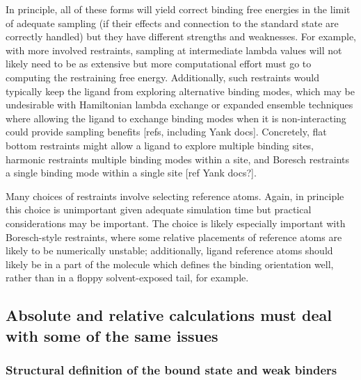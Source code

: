 \documentclass[9pt,bestpractices]{livecoms}
\begin{document}
In principle, all of these forms will yield correct binding free energies in the limit of adequate sampling (if their effects and connection to the standard state are correctly handled) but they have different strengths and weaknesses.
For example, with more involved restraints, sampling at intermediate lambda values will not likely need to be as extensive but more computational effort must go to computing the restraining free energy.
Additionally, such restraints would typically keep the ligand from exploring alternative binding modes, which may be undesirable with Hamiltonian lambda exchange or expanded ensemble techniques where allowing the ligand to exchange binding modes when it is non-interacting could provide sampling benefits [refs, including Yank docs].
Concretely, flat bottom restraints might allow a ligand to explore multiple binding sites, harmonic restraints multiple binding modes within a site, and Boresch restraints a single binding mode within a single site [ref Yank docs?].

Many choices of restraints involve selecting reference atoms.
Again, in principle this choice is unimportant given adequate simulation time but practical considerations may be important.
The choice is likely especially important with Boresch-style restraints, where some relative placements of reference atoms are likely to be numerically unstable; additionally, ligand reference atoms should likely be in a part of the molecule which defines the binding orientation well, rather than in a floppy solvent-exposed tail, for example.



\subsection{Absolute and relative calculations must deal with some of the same issues}

\subsubsection{Structural definition of the bound state and weak binders}
\end{document}

